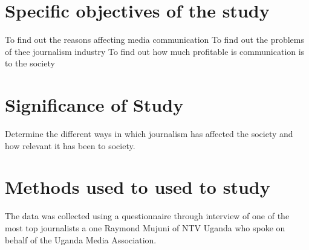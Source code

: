 \documentclass[12pt,]{article}
\begin{document}
\section{Specific objectives of the study}
To find out the reasons affecting media communication
To find out the problems of thee journalism industry
To find out how much profitable is communication is to the society

\section{Significance of Study}
Determine the different ways in which journalism has affected the society and how relevant it has been to society.

\section{Methods used to used to study}
The data was collected using a questionnaire through interview of one of the most top journalists a one Raymond Mujuni of NTV Uganda who spoke on behalf of the Uganda Media Association.
\end{document}
